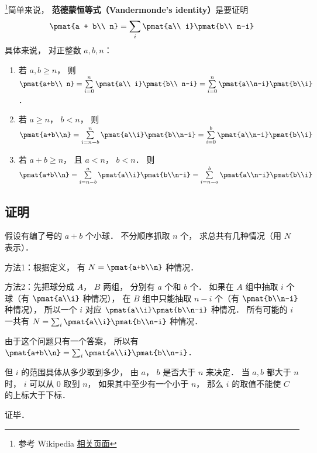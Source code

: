 

\footnote{参考 Wikipedia \href{https://en.wikipedia.org/wiki/Vandermonde's_identity}{相关页面}}简单来说， \textbf{范德蒙恒等式（Vandermonde's identity）}是要证明
\begin{equation}
\pmat{a + b\\ n} = \sum_i \pmat{a\\ i} \pmat{b\\ n-i}
\end{equation}
具体来说， 对正整数 $a,b,n$：
\begin{enumerate}
\item 若 $a,b \geqslant n$，  则 $\pmat{a+b\\ n} = \sum\limits_{i = 0}^n \pmat{a\\ i} \pmat{b\\ n-i} = \sum\limits_{i = 0}^n \pmat{a\\n-i}\pmat{b\\i}$． 
\item 若 $a \geqslant n$，  $b < n$，   则  $\pmat{a+b\\n} = \sum\limits_{i = n - b}^n \pmat{a\\i}\pmat{b\\n-i} = \sum\limits_{i = 0}^b \pmat{a\\n-i} \pmat{b\\i}$ 
\item 若 $a + b \geqslant n$，   且 $a < n$，   $b < n$．  则  $\pmat{a+b\\n} = \sum\limits_{i = n - b}^a \pmat{a\\i} \pmat{b\\n-i} = \sum\limits_{i = n - a}^b \pmat{a\\n-i} \pmat{b\\i}$ 
\end{enumerate}

\subsection{证明}

假设有编了号的 $a+b$ 个小球． 不分顺序抓取 $n$ 个， 求总共有几种情况（用 $N$ 表示）．

方法1：根据定义， 有 $N = \pmat{a+b\\n}$ 种情况．

方法2：先把球分成 $A$，  $B$ 两组， 分别有 $a$ 个和 $b$ 个． 如果在 $A$ 组中抽取 $i$ 个球（有 $\pmat{a\\i}$ 种情况）， 在 $B$ 组中只能抽取  $n - i$ 个（有 $\pmat{b\\n-i}$ 种情况）， 所以一个 $i$ 对应 $\pmat{a\\i} \pmat{b\\n-i}$ 种情况． 所有可能的 $i$ 一共有 $N = \sum_i \pmat{a\\i} \pmat{b\\n-i}$ 种情况．

由于这个问题只有一个答案， 所以有 $\pmat{a+b\\n} = \sum_i \pmat{a\\i} \pmat{b\\n-i}$． 

但 $i$ 的范围具体从多少取到多少， 由 $a$，  $b$ 是否大于 $n$ 来决定． 当 $a,b$ 都大于 $n$ 时， $i$ 可以从 0 取到 $n$，  如果其中至少有一个小于 $n$，  那么 $i$ 的取值不能使 $C$ 的上标大于下标．

证毕．
